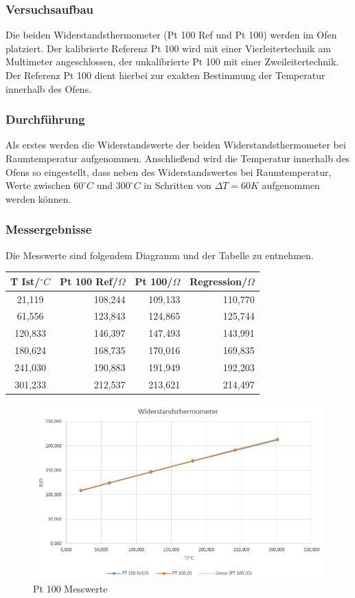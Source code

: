 \documentclass[a4paper,11pt,oneside]{article}
\begin{document}
\subsubsection{Versuchsaufbau}
Die beiden Widerstandsthermometer (Pt 100 Ref und Pt 100) werden im Ofen platziert. Der kalibrierte Referenz Pt 100 wird mit einer Vierleitertechnik am Multimeter angeschlossen, der unkalibrierte Pt 100 mit einer Zweileitertechnik. \\ 
Der Referenz Pt 100 dient hierbei zur exakten Bestimmung der Temperatur innerhalb des Ofens. 
\subsubsection{Durchführung}
Als erstes werden die Widerstandswerte der beiden Widerstandsthermometer bei Raumtemperatur aufgenommen. Anschließend wird die Temperatur innerhalb des Ofens so eingestellt, dass neben des Widerstandswertes bei Raumtemperatur, Werte zwischen $60^\circ C$ und  $300^\circ C$ in Schritten von $\Delta T = 60K$ aufgenommen werden können. 
\subsubsection{Messergebnisse}
Die Messwerte sind folgendem Diagramm und der Tabelle zu entnehmen. \\
\begin{center}
\begin{tabular}{|c|r|r|r|}
\hline 
T Ist/$^\circ C$ & Pt 100 Ref/$\Omega$ & Pt 100/$\Omega$ & Regression/$\Omega$ \\ 
\hline 
21,119 & 108,244 & 109,133 & 110,770 \\ 
\hline 
61,556 & 123,843 & 124,865 & 125,744 \\ 
\hline 
120,833 & 146,397 & 147,493 & 143,991 \\ 
\hline 
180,624 & 168,735 & 170,016 & 169,835 \\ 
\hline 
241,030 & 190,883 & 191,949 & 192,203 \\ 
\hline 
301,233 & 212,537 & 213,621 & 214,497 \\ 
\hline 
\end{tabular} 
\end{center}
\begin{figure}[h]
\centering
\includegraphics[scale=0.8]{Bilder/Aufg1Diagramm.png}
\caption{Pt 100 Messwerte}
\end{figure}
\newpage
\end{document}
